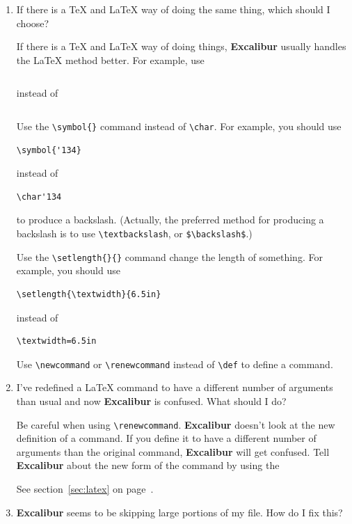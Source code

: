 ﻿\documentclass[11pt,titlepage]{article}
\newcommand{\ex}{\textbf{Excalibur}}
\begin{document}
\begin{enumerate}

\item If there is a \TeX{} and \LaTeX{} way of doing the same thing,
  which should I choose?

  If there is a \TeX{} and \LaTeX{} way of doing things, \ex{} usually
  handles the \LaTeX{} method better. For example, use
\begin{verbatim}

\end{verbatim}
  instead of
\begin{verbatim}

\end{verbatim}

  Use the \verb+\symbol{}+ command instead of \verb+\char+. For
  example, you should use
\begin{verbatim}
\symbol{'134}
\end{verbatim}
  instead of
\begin{verbatim}
\char'134
\end{verbatim}
  to produce a backslash.  (Actually, the preferred method for producing
  a backslash is to use \verb+\textbackslash+, or \verb+$\backslash$+.)

  Use the \verb+\setlength{}{}+ command change the length of
  something. For example, you should use
\begin{verbatim}
\setlength{\textwidth}{6.5in}
\end{verbatim}
  instead of
\begin{verbatim}
\textwidth=6.5in
\end{verbatim}

  Use \verb+\newcommand+ or \verb+\renewcommand+ instead of
  \verb+\def+ to define a command.

\item I've redefined a \LaTeX{} command to have a different number of
  arguments than usual and now \ex{} is confused.  What should I do?

  Be careful when using \verb+\renewcommand+. \ex{} doesn't look at
  the new definition of a command. If you define it to have a
  different number of arguments than the original command, \ex{} will
  get confused.  Tell \ex{} about the new form of the command by using
  the 
  \begin{latexonly}
    See section~\ref{sec:latex} on
    page~\pageref{sec:latex}.
  \end{latexonly}

\item \ex{} seems to be skipping large portions of my file.  How do I
  fix this?


\end{enumerate}
\end{document}
